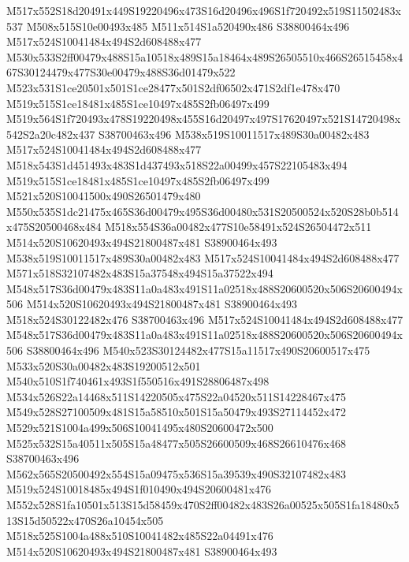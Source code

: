 \documentclass{article}
\begin{document}
\begin{multicols}{2}
M517x552S18d20491x449S19220496x473S16d20496x496S1f720492x519S11502483x537 M508x515S10e00493x485 M511x514S1a520490x486 S38800464x496 M517x524S10041484x494S2d608488x477 M530x533S2ff00479x488S15a10518x489S15a18464x489S26505510x466S26515458x467S30124479x477S30e00479x488S36d01479x522 M523x531S1ce20501x501S1ce28477x501S2df06502x471S2df1e478x470 M519x515S1ce18481x485S1ce10497x485S2fb06497x499 M519x564S1f720493x478S19220498x455S16d20497x497S17620497x521S14720498x542S2a20c482x437 S38700463x496 M538x519S10011517x489S30a00482x483 M517x524S10041484x494S2d608488x477 M518x543S1d451493x483S1d437493x518S22a00499x457S22105483x494 M519x515S1ce18481x485S1ce10497x485S2fb06497x499 M521x520S10041500x490S26501479x480 M550x535S1dc21475x465S36d00479x495S36d00480x531S20500524x520S28b0b514x475S20500468x484 M518x554S36a00482x477S10e58491x524S26504472x511 M514x520S10620493x494S21800487x481 S38900464x493 M538x519S10011517x489S30a00482x483 M517x524S10041484x494S2d608488x477 M571x518S32107482x483S15a37548x494S15a37522x494 M548x517S36d00479x483S11a0a483x491S11a02518x488S20600520x506S20600494x506 M514x520S10620493x494S21800487x481 S38900464x493 M518x524S30122482x476 S38700463x496 M517x524S10041484x494S2d608488x477 M548x517S36d00479x483S11a0a483x491S11a02518x488S20600520x506S20600494x506 S38800464x496 M540x523S30124482x477S15a11517x490S20600517x475 M533x520S30a00482x483S19200512x501 M540x510S1f740461x493S1f550516x491S28806487x498 M534x526S22a14468x511S14220505x475S22a04520x511S14228467x475 M549x528S27100509x481S15a58510x501S15a50479x493S27114452x472 M529x521S1004a499x506S10041495x480S20600472x500 M525x532S15a40511x505S15a48477x505S26600509x468S26610476x468 S38700463x496 M562x565S20500492x554S15a09475x536S15a39539x490S32107482x483 M519x524S10018485x494S1f010490x494S20600481x476 M552x528S1fa10501x513S15d58459x470S2ff00482x483S26a00525x505S1fa18480x513S15d50522x470S26a10454x505 M518x525S1004a488x510S10041482x485S22a04491x476 M514x520S10620493x494S21800487x481 S38900464x493





\end{multicols}
\end{document}
